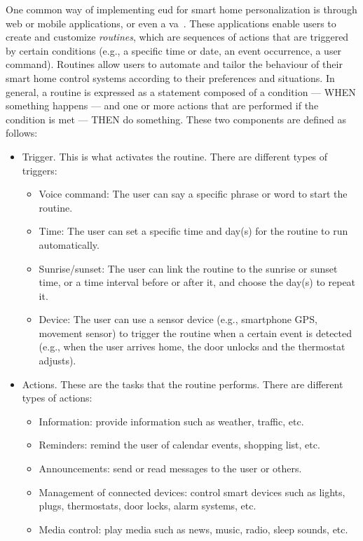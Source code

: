 One common way of implementing \acrshort{eud} for smart home personalization is through web or mobile applications, or even a \acrfull{va}~\parencite{barricelliVirtualAssistantsPersonalizing2021,arditoSmartObjectsSmart2018}. These applications enable users to create and customize \textit{routines}, which are sequences of actions that are triggered by certain conditions (e.g., a specific time or date, an event occurrence, a user command). Routines allow users to automate and tailor the behaviour of their smart home control systems according to their preferences and situations. In general, a routine is expressed as a statement composed of a condition --- WHEN something happens --- and one or more actions that are performed if the condition is met --- THEN do something.
These two components are defined as follows:
\begin{itemize}
    \item Trigger. This is what activates the routine. There are different types of triggers:
        \begin{itemize}
            \item Voice command: The user can say a specific phrase or word to start the routine.
            \item Time: The user can set a specific time and day(s) for the routine to run automatically. 
            \item Sunrise/sunset: The user can link the routine to the sunrise or sunset time, or a time interval before or after it, and choose the day(s) to repeat it.
            \item Device: The user can use a sensor device (e.g., smartphone GPS, movement sensor) to trigger the routine when a certain event is detected (e.g., when the user arrives home, the door unlocks and the thermostat adjusts).
        \end{itemize}
    \item Actions. These are the tasks that the routine performs. There are different types of actions:
        \begin{itemize}
            \item Information: provide information such as weather, traffic, etc.
            \item Reminders: remind the user of calendar events, shopping list, etc.
            \item Announcements: send or read messages to the user or others.
            \item Management of connected devices: control smart devices such as lights, plugs, thermostats, door locks, alarm systems, etc.
            \item Media control: play media such as news, music, radio, sleep sounds, etc.
        \end{itemize}
\end{itemize}

